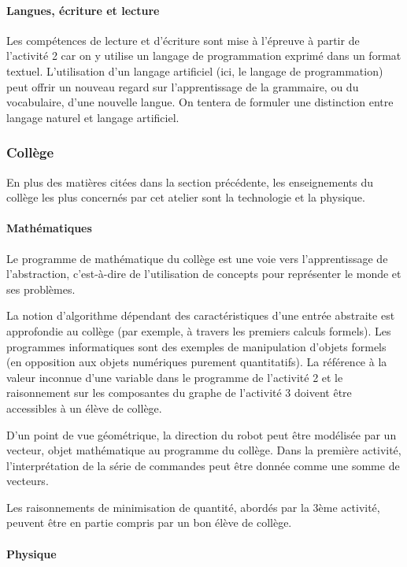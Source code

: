 \documentclass[11pt,a4paper]{article}
\begin{document}
\paragraph{Langues, écriture et lecture}

Les compétences de lecture et d'écriture sont mise à l'épreuve à
partir de l'activité 2 car on y utilise un langage de programmation
exprimé dans un format textuel. L'utilisation d'un langage artificiel
(ici, le langage de programmation) peut offrir un nouveau regard sur
l'apprentissage de la grammaire, ou du vocabulaire, d'une nouvelle
langue. On tentera de formuler une distinction entre langage naturel
et langage artificiel. 


\subsubsection{Collège}

En plus des matières citées dans la section précédente, les enseignements du collège
les plus concernés par cet atelier sont la technologie et la physique. 

\paragraph{Mathématiques}

Le programme de mathématique du collège est une voie vers
l'apprentissage de l'abstraction, c'est-à-dire de l'utilisation de
concepts pour représenter le monde et ses problèmes. 

La notion d'algorithme dépendant des caractéristiques d'une entrée
abstraite est approfondie au collège (par exemple, à travers les
premiers calculs formels). Les programmes informatiques sont des
exemples de manipulation d'objets formels (en opposition aux objets
numériques purement quantitatifs). La référence à la valeur
inconnue d'une variable dans le programme de l'activité 2 et le
raisonnement sur les composantes du graphe de l'activité 3 doivent
être accessibles à un élève de collège.

D'un point de vue géométrique, la direction du robot peut être modélisée
par un vecteur, objet mathématique au programme du collège. Dans la première
activité, l'interprétation de la série de commandes peut être donnée comme une 
somme de vecteurs. 

Les raisonnements de minimisation de quantité, abordés par la 3ème activité, peuvent
être en partie compris par un bon élève de collège. 

\paragraph{Physique}
\end{document}
